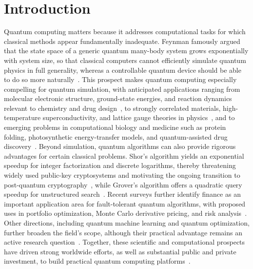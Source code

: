 \chapter{Introduction}
\label{chap:intro}

Quantum computing matters because it addresses computational tasks for which classical methods appear fundamentally inadequate. Feynman famously argued that the state space of a generic quantum many-body system grows exponentially with system size, so that classical computers cannot efficiently simulate quantum physics in full generality, whereas a controllable quantum device should be able to do so more naturally~\cite{Feynman1982,Lloyd1996}. This prospect makes quantum computing especially compelling for quantum simulation, with anticipated applications ranging from molecular electronic structure, ground-state energies, and reaction dynamics relevant to chemistry and drug design~\cite{Cao2019,McArdle2020}, to strongly correlated materials, high-temperature superconductivity, and lattice gauge theories in physics~\cite{Georgescu2014,Wiese2013}, and to emerging problems in computational biology and medicine such as protein folding, photosynthetic energy-transfer models, and quantum-assisted drug discovery~\cite{Outeiral2021,Santagati2024}. Beyond simulation, quantum algorithms can also provide rigorous advantages for certain classical problems. Shor's algorithm yields an exponential speedup for integer factorization and discrete logarithms, thereby threatening widely used public-key cryptosystems and motivating the ongoing transition to post-quantum cryptography~\cite{Shor1994,Dalzell_2025,NIST2024PQC}, while Grover's algorithm offers a quadratic query speedup for unstructured search~\cite{Grover1996,Montanaro2016}. Recent surveys further identify finance as an important application area for fault-tolerant quantum algorithms, with proposed uses in portfolio optimization, Monte Carlo derivative pricing, and risk analysis~\cite{Dalzell_2025,Orus2019,Herman2023}. Other directions, including quantum machine learning and quantum optimization, further broaden the field's scope, although their practical advantage remains an active research question~\cite{Biamonte2017,Blekos2024}. Together, these scientific and computational prospects have driven strong worldwide efforts, as well as substantial public and private investment, to build practical quantum computing platforms~\cite{NaturePhysics2023,Soller2025}.

